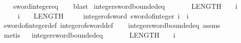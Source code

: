 \begin{isabellebody}
\ \ \isamarkupfalse%
\ sword{\isacharunderscore}{\kern0pt}integer{\isacharunderscore}{\kern0pt}eq\isanewline
\ \ \isamarkupfalse%
\ blast%
\endisatagproof
{\isafoldproof}%
%
\isadelimproof
\isanewline
%
\endisadelimproof
\isanewline
{}\isamarkupfalse%
\ integer{\isacharunderscore}{\kern0pt}sword{}{\isacharunderscore}{\kern0pt}bounded{\isacharunderscore}{\kern0pt}eq{\isacharcolon}{\kern0pt}\isanewline
\ \ \ \ {\isachardoublequoteopen}{\isacharminus}{\kern0pt}\ {\isacharparenleft}{\kern0pt}{}\ {\isacharcircum}{\kern0pt}\ {\isacharparenleft}{\kern0pt}LENGTH{\isacharparenleft}{\kern0pt}{}{\isacharparenright}{\kern0pt}\ {\isacharminus}{\kern0pt}\ {}{\isacharparenright}{\kern0pt}{\isacharparenright}{\kern0pt}\ {\isasymle}\ i{\isachardoublequoteclose}\isanewline
\ \ \ \ \ {\isachardoublequoteopen}i\ {\isacharless}{\kern0pt}\ {}\ {\isacharcircum}{\kern0pt}\ {\isacharparenleft}{\kern0pt}LENGTH{\isacharparenleft}{\kern0pt}{}{\isacharparenright}{\kern0pt}\ {\isacharminus}{\kern0pt}\ {}{\isacharparenright}{\kern0pt}{\isachardoublequoteclose}\isanewline
\ \ \ {\isachardoublequoteopen}integer{\isacharunderscore}{\kern0pt}of{\isacharunderscore}{\kern0pt}sword{}\ {\isacharparenleft}{\kern0pt}sword{}{\isacharunderscore}{\kern0pt}of{\isacharunderscore}{\kern0pt}integer\ i{\isacharparenright}{\kern0pt}\ {\isacharequal}{\kern0pt}\ i{\isachardoublequoteclose}\isanewline
%
\isadelimproof
\ \ %
\endisadelimproof
%
\isatagproof
{}\isamarkupfalse%
\ sword{}{\isacharunderscore}{\kern0pt}of{\isacharunderscore}{\kern0pt}integer{\isacharunderscore}{\kern0pt}def\ integer{\isacharunderscore}{\kern0pt}of{\isacharunderscore}{\kern0pt}sword{}{\isacharunderscore}{\kern0pt}def\isanewline
\ \ \isamarkupfalse%
\ integer{\isacharunderscore}{\kern0pt}sword{\isacharunderscore}{\kern0pt}bounded{\isacharunderscore}{\kern0pt}eq\ assms\ \isanewline
\ \ \isamarkupfalse%
\ metis%
\endisatagproof
{\isafoldproof}%
%
\isadelimproof
\ \isanewline
%
\endisadelimproof
\isanewline
{}\isamarkupfalse%
\ integer{\isacharunderscore}{\kern0pt}sword{}{}{\isacharunderscore}{\kern0pt}bounded{\isacharunderscore}{\kern0pt}eq{\isacharcolon}{\kern0pt}\isanewline
\ \ \ \ {\isachardoublequoteopen}{\isacharminus}{\kern0pt}\ {\isacharparenleft}{\kern0pt}{}\ {\isacharcircum}{\kern0pt}\ {\isacharparenleft}{\kern0pt}LENGTH{\isacharparenleft}{\kern0pt}{}{}{\isacharparenright}{\kern0pt}\ {\isacharminus}{\kern0pt}\ {}{\isacharparenright}{\kern0pt}{\isacharparenright}{\kern0pt}\ {\isasymle}\ i{\isachardoublequoteclose}\isanewline

\end{isabellebody}
